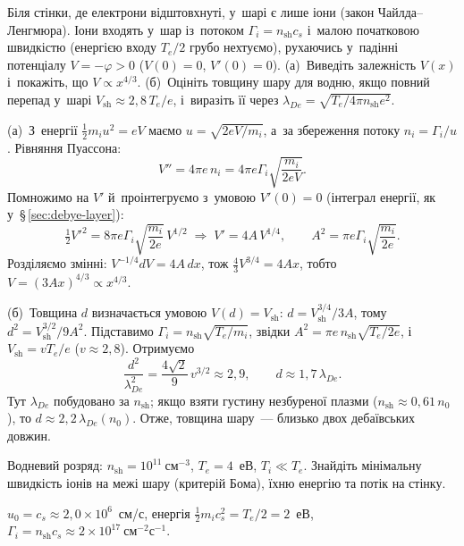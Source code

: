 \begin{problem}\label{prb:SheathChildLangmuir}
	Біля стінки, де електрони відштовхнуті, у~шарі є лише іони (закон Чайлда--Ленгмюра). Іони входять у~шар
	із~потоком $\Gamma_i=n_\mathrm{sh}c_s$ і~малою початковою швидкістю (енергією входу $T_e/2$ грубо нехтуємо), рухаючись у~падінні потенціалу
	$V=-\varphi>0$ ($V(0)=0$, $V'(0)=0$). (а)~Виведіть залежність $V(x)$ і~покажіть, що
	$V\propto x^{4/3}$. (б)~Оцініть товщину шару для водню, якщо повний перепад у~шарі
	$V_\mathrm{sh}\approx2{,}8\,T_e/e$, і~виразіть її через $\lambda_{De}=\sqrt{T_e/4\pi n_\mathrm{sh}e^2}$.
	\begin{solution}
		(а)~З~енергії $\tfrac12m_iu^2=eV$ маємо $u=\sqrt{2eV/m_i}$, а~за збереження потоку
		$n_i=\Gamma_i/u$. Рівняння Пуассона:
		\[ V''=4\pi e\,n_i=4\pi e\Gamma_i\sqrt{\frac{m_i}{2eV}}. \]
		Помножимо на $V'$ й~проінтегруємо з~умовою $V'(0)=0$ (інтеграл енергії, як у~§\,\ref{sec:debye-layer}):
		\[ \tfrac12V'^2=8\pi e\Gamma_i\sqrt{\frac{m_i}{2e}}\,V^{1/2}
		\;\Rightarrow\; V'=4A\,V^{1/4},\qquad A^2=\pi e\Gamma_i\sqrt{\frac{m_i}{2e}}. \]
		Розділяємо змінні: $V^{-1/4}dV=4A\,dx$, тож $\tfrac43V^{3/4}=4Ax$, тобто
		$V=(3Ax)^{4/3}\propto x^{4/3}$.

		(б)~Товщина $d$ визначається умовою $V(d)=V_\mathrm{sh}$: $d=V_\mathrm{sh}^{3/4}/3A$, тому
		$d^2=V_\mathrm{sh}^{3/2}/9A^2$. Підставимо $\Gamma_i=n_\mathrm{sh}\sqrt{T_e/m_i}$, звідки
		$A^2=\pi e\,n_\mathrm{sh}\sqrt{T_e/2e}$, і~$V_\mathrm{sh}=vT_e/e$ ($v\approx2{,}8$). Отримуємо
		\[ \frac{d^2}{\lambda_{De}^2}=\frac{4\sqrt2}{9}\,v^{3/2}\approx2{,}9,
		\qquad d\approx1{,}7\,\lambda_{De}. \]
		Тут $\lambda_{De}$ побудовано за $n_\mathrm{sh}$; якщо взяти густину незбуреної плазми
		($n_\mathrm{sh}\approx0{,}61\,n_0$), то $d\approx2{,}2\,\lambda_{De}(n_0)$. Отже,
		товщина шару~--- близько двох дебаївських довжин.
	\end{solution}
\end{problem}

\begin{problem}\label{prb:BohmFlux}
	Водневий розряд: $n_\mathrm{sh}=10^{11}~\mathrm{см}^{-3}$, $T_e=4$~еВ, $T_i\ll T_e$. Знайдіть мінімальну швидкість іонів на межі шару
	(критерій Бома), їхню енергію та потік на стінку.
	\begin{solution}
		$u_0=c_s\approx2{,}0\times10^{6}$~см/с, енергія $\tfrac12m_ic_s^2=T_e/2=2$~еВ,
	$\Gamma_i=n_\mathrm{sh}c_s\approx2\times10^{17}~\mathrm{см}^{-2}\mathrm{с}^{-1}$.
	\end{solution}
\end{problem}

